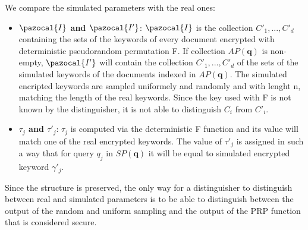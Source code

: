 We compare the simulated parameters with the real ones:

\begin{itemize}
    \item \textbf{$\pazocal{I}$ and $\pazocal{I'}$}: $\pazocal{I}$ is the collection ${C'_1,...,C'_d}$ containing the sets of the keywords of every document encrypted with deterministic pseudorandom permutation F. If collection $AP(\textbf{q})$ is non-empty, $\pazocal{I'}$ will contain the collection ${C'_1,...,C'_d}$ of the sets of the simulated keywords of the documents indexed in $AP(\textbf{q})$. The simulated encripted keywords are sampled uniformely and randomly and with lenght n, matching the length of the real keywords. Since the key used with F is not known by the distinguisher, it is not able to distinguish $C_i$ from $C'_i$.
    \item \textbf{$\tau _j$ and $\tau '_j$}: $\tau _j$ is computed via the deterministic F function and its value will match one of the real encrypted keywords. The value of $\tau '_j$ is assigned in such a way that for query $q_j$ in $SP(\textbf{q})$ it will be equal to simulated encrypted keyword $\gamma '_j$. 
\end{itemize}

Since the structure is preserved, the only way for a distinguisher to distinguish between real and simulated parameters is to be able to distinguish between the output of the random and uniform sampling and the output of the PRP function that is considered secure.

